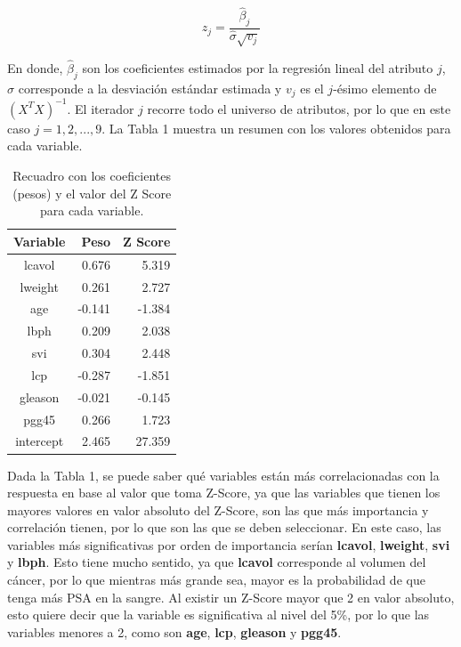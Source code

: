 \documentclass[letter, 10pt]{article}
\begin{document}
\begin{equation}
z_j=\frac{\hat{\beta}_j}{\hat{\sigma }\sqrt{v_j}}
\end{equation}

En donde, $\hat{\beta }_j$ son los coeficientes estimados por la regresión lineal del atributo $j$, $\hat{\sigma }$ corresponde a la desviación estándar estimada y $v_j$ es el $j$-ésimo elemento de $\left ( X^{T}X \right )^{-1}$. El iterador $j$ recorre todo el universo de atributos, por lo que en este caso $j=1,2,...,9$. La Tabla 1 muestra un resumen con los valores obtenidos para cada variable.

\begin{table}[!hbt] 
\begin{center}
\begin{tabular}{| c | r | r |} 
\hline
\textbf{Variable} & \textbf{Peso} & \textbf{Z Score}\\ 
\hline 
lcavol & 0.676 & 5.319\\ 
lweight &0.261 & 2.727\\
age &-0.141 & -1.384\\
lbph &0.209 & 2.038\\
svi & 0.304& 2.448\\
lcp & -0.287& -1.851\\
gleason & -0.021& -0.145\\
pgg45 &0.266 &  1.723\\
intercept &2.465 & 27.359\\
\hline 
\end{tabular}
\caption{Recuadro con los coeficientes (pesos) y el valor del Z Score para cada variable.} 
\label{table:zscore}
\end{center} 
\end{table}

Dada la Tabla 1, se puede saber qué variables están más correlacionadas con la respuesta en base al valor que toma Z-Score, ya que las variables que tienen los mayores valores en valor absoluto del Z-Score, son las que más importancia y correlación tienen, por lo que son las que se deben seleccionar. En este caso, las variables más significativas por orden de importancia serían \textbf{lcavol}, \textbf{lweight}, \textbf{svi} y \textbf{lbph}. Esto tiene mucho sentido, ya que \textbf{lcavol} corresponde al volumen del cáncer, por lo que mientras más grande sea, mayor es la probabilidad de que tenga más PSA en la sangre. Al existir un Z-Score mayor que 2 en valor absoluto, esto quiere decir que la variable es significativa al nivel del 5\%, por lo que las variables menores a 2, como son \textbf{age}, \textbf{lcp}, \textbf{gleason} y \textbf{pgg45}.\\
\end{document}
